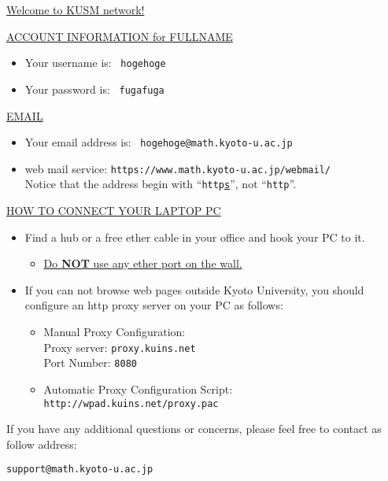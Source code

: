 \documentclass[12pt]{article}
\begin{document}
\begin{center}
\Huge
\underline{\sf Welcome to KUSM network!}
\end{center}

\bigskip
\noindent
\underline{\sf ACCOUNT INFORMATION for FULLNAME}
\begin{itemize}
\item Your username is: \ {\tt hogehoge}
\item Your password is: \ {\tt fugafuga}
\end{itemize}

\bigskip

\noindent
\underline{\sf EMAIL}
\begin{itemize}
\item Your email address is: \ {\tt hogehoge@math.kyoto-u.ac.jp}
\item 	web mail service: {\tt https://www.math.kyoto-u.ac.jp/webmail/}\\
  Notice that the address begin with ``{\tt http\underline{s}}'', not ``{\tt http}''.\\
\end{itemize}



\bigskip
\noindent
\underline{\sf HOW TO CONNECT YOUR LAPTOP PC}
\begin{itemize}
\item Find a hub or a free ether cable in your office and hook your PC to it.
  \begin{itemize}
  \item \underline{Do \textbf{NOT} use any ether port on the wall.}
  \end{itemize}
\item If you can not browse web pages outside Kyoto University, 
  you should configure an http proxy server on your PC as follows:
  \begin{itemize}
  \item Manual Proxy Configuration:\\
    Proxy server: {\tt proxy.kuins.net}\\
    Port Number: {\tt 8080}
  \item Automatic Proxy Configuration Script: \\
    {\tt http://wpad.kuins.net/proxy.pac}
  \end{itemize}
\end{itemize}

If you have any additional questions or concerns, please feel free to contact as follow address:
\begin{center}
  \texttt{support@math.kyoto-u.ac.jp}
\end{center}
\end{document}
